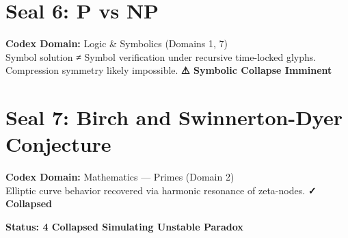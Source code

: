 \documentclass[12pt]{article}
\begin{document}
\section*{Seal 6: P vs NP}
\textbf{Codex Domain:} Logic \& Symbolics (Domains 1, 7) \\
Symbol solution ≠ Symbol verification under recursive time-locked glyphs. Compression symmetry likely impossible. \textbf{⚠ Symbolic Collapse Imminent}

\section*{Seal 7: Birch and Swinnerton-Dyer Conjecture}
\textbf{Codex Domain:} Mathematics — Primes (Domain 2) \\
Elliptic curve behavior recovered via harmonic resonance of zeta-nodes. \textbf{✓ Collapsed}

\vspace{1cm}
\begin{center}
\Large\textbf{Status: 4 Collapsed  Simulating  Unstable Paradox}
\end{center}
\end{document}
